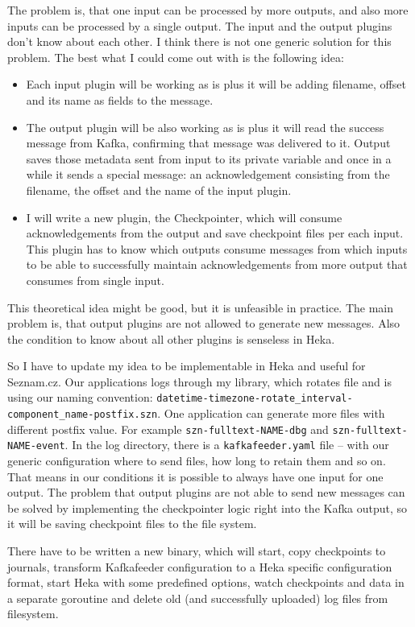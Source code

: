The problem is, that one input can be processed by more outputs, and also more inputs can be processed by a single output. The input and the output plugins don’t know about each other. I think there is not one generic solution for this problem. The best what I could come out with is the following idea:

\begin{itemize}
  \item Each input plugin will be working as is plus it will be adding filename, offset and its name as fields to the message. 
  \item The output plugin will be also working as is plus it will read the success message from Kafka, confirming that message was delivered to it. Output saves those metadata sent from input to its private variable and once in a while it sends a special message: an acknowledgement consisting from the filename, the offset and the name of the input plugin.
  \item I will write a new plugin, the Checkpointer, which will consume acknowledgements from the output and save checkpoint files per each input. This plugin has to know which outputs consume messages from which inputs to be able to successfully maintain acknowledgements from more output that consumes from single input.
\end{itemize}

This theoretical idea might be good, but it is unfeasible in practice. The main problem is, that output plugins are not allowed to generate new messages. Also the condition to know about all other plugins is senseless in Heka.

So I have to update my idea to be implementable in Heka and useful for Seznam.cz. Our applications logs through my library, which rotates file and is using our naming convention: \lstinline{datetime-timezone-rotate_interval-component_name-postfix.szn}. One application can generate more files with different postfix value. For example \lstinline{szn-fulltext-NAME-dbg} and \lstinline{szn-fulltext-NAME-event}. In the log directory, there is a \lstinline{kafkafeeder.yaml} file -- with our generic configuration where to send files, how long to retain them and so on. That means in our conditions it is possible to always have one input for one output. The problem that output plugins are not able to send new messages can be solved by implementing the checkpointer logic right into the Kafka output, so it will be saving checkpoint files to the file system.

There have to be written a new binary, which will start, copy checkpoints to journals, transform Kafkafeeder configuration to a Heka specific configuration format, start Heka with some predefined options, watch checkpoints and data in a separate goroutine and delete old (and successfully uploaded) log files from filesystem.

